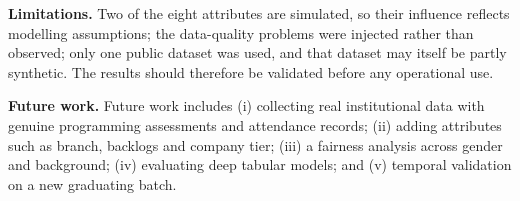 \documentclass[conference]{IEEEtran}
\begin{document}
\textbf{Limitations.} Two of the eight attributes are simulated, so their influence reflects modelling
assumptions; the data-quality problems were injected rather than observed; only one public dataset was used, and
that dataset may itself be partly synthetic. The results should therefore be validated before any operational use.

\textbf{Future work.} Future work includes (i) collecting real institutional data with genuine programming
assessments and attendance records; (ii) adding attributes such as branch, backlogs and company tier; (iii) a
fairness analysis across gender and background; (iv) evaluating deep tabular models; and (v) temporal validation
on a new graduating batch.



\end{document}
